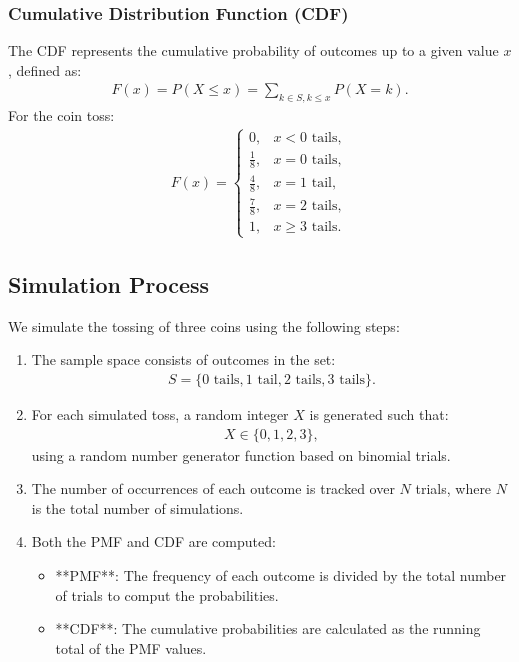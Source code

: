 \documentclass[journal]{IEEEtran}
\begin{document}
\subsubsection*{Cumulative Distribution Function (CDF)}
The CDF represents the cumulative probability of outcomes up to a given value \( x \), defined as:
\begin{align}
F(x) = P(X \leq x) = \sum_{k \in S, k \leq x} P(X = k).
\end{align}
For the coin toss:
\begin{align}
F(x) = 
\begin{cases} 
0, & x < 0 \text{ tails}, \\
\frac{1}{8}, & x = 0 \text{ tails}, \\
\frac{4}{8}, & x = 1 \text{ tail}, \\
\frac{7}{8}, & x = 2 \text{ tails}, \\
1, & x \geq 3 \text{ tails}.
\end{cases}
\end{align}

\subsection*{Simulation Process}
We simulate the tossing of three coins using the following steps:
\begin{enumerate}
    \item The sample space consists of outcomes in the set:
    \begin{align}
    S = \{0 \text{ tails}, 1 \text{ tail}, 2 \text{ tails}, 3 \text{ tails}\}.
    \end{align}
    \item For each simulated toss, a random integer \( X \) is generated such that:
    \begin{align}
    X \in \{0, 1, 2, 3\},
    \end{align}
    using a random number generator function based on binomial trials.
    \item The number of occurrences of each outcome is tracked over \( N \) trials, where \( N \) is the total number of simulations.
    \item Both the PMF and CDF are computed:
    \begin{itemize}
        \item **PMF**: The frequency of each outcome is divided by the total number of trials to comput the probabilities.
        \item **CDF**: The cumulative probabilities are calculated as the running total of the PMF values.
    \end{itemize}
\end{enumerate}
\end{document}

